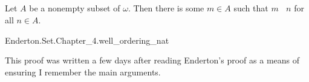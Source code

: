 \documentclass{report}
\newcommand{\ineq}{\,\mathop{\underline{\in}}\,}
\begin{document}
\subsection{}%

  \begin{theorem}
    Let $A$ be a nonempty subset of $\omega$.
    Then there is some $m \in A$ such that $m \ineq n$ for all $n \in A$.
  \end{theorem}

    {Enderton.Set.Chapter\_4.well\_ordering\_nat}


  \begin{note}
    This proof was written a few days after reading Enderton's proof as a means
      of ensuring I remember the main arguments.
  \end{note}
\end{document}
